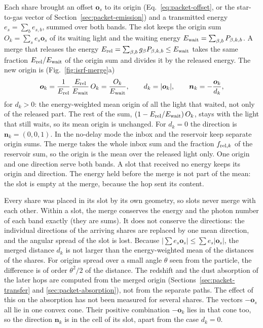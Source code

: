 Each share brought an offset $\boldsymbol{o}_s$ to its origin
(Eq.~\eqref{eq:packet-offset}, or the star-to-gas vector of
Section~\ref{sec:packet-emission}) and a transmitted energy
$e_s=\sum_b e_{s,b}$, summed over both bands. The slot keeps the origin sum
$O_k=\sum_s e_s\boldsymbol{o}_s$ of its waiting light and the waiting energy
$E_{\rm wait}=\sum_{\beta,b}P_{\beta,k,b}$. A merge that releases the energy
$E_{\rm rel}=\sum_{\beta,b}g_\beta P_{\beta,k,b}\le E_{\rm wait}$ takes the
same fraction $E_{\rm rel}/E_{\rm wait}$ of the origin sum and divides it by
the released energy. The new origin is (Fig.~\ref{fig:isrf-merge}a)
\begin{equation}
  \boldsymbol{o}_k = \frac{1}{E_{\rm rel}}\,
  \frac{E_{\rm rel}}{E_{\rm wait}}\,O_k = \frac{O_k}{E_{\rm wait}},
  \qquad d_k=|\boldsymbol{o}_k|, \qquad
  \boldsymbol{n}_k = -\frac{\boldsymbol{o}_k}{d_k},
  \label{eq:packet-merge-origin}
\end{equation}
for $d_k>0$: the energy-weighted mean origin of all the light that waited, not
only of the released part. The rest of the sum,
$(1-E_{\rm rel}/E_{\rm wait})\,O_k$, stays with the light that still waits, so
its mean origin is unchanged. For $d_k=0$ the direction is
$\boldsymbol{n}_k=(0,0,1)$. In the no-delay mode the inbox and the reservoir
keep separate origin sums. The merge takes the whole inbox sum and the
fraction $f_{{\rm rel},k}$ of the reservoir sum, so the origin is the mean
over the released light only. One
origin and one direction serve both bands. A slot that received no energy
keeps its origin and direction. The energy held before the merge is not part
of the mean: the slot is empty at the merge, because the hop sent its content.

Every share was placed in its slot by its own geometry, so slots never merge
with each other. Within a slot, the merge conserves the energy and the photon
number of each band exactly (they are sums). It does not conserve the
directions: the individual directions of the arriving shares are replaced by
one mean direction, and the angular spread of the slot is lost. Because
$|\sum e_s\boldsymbol{o}_s|\le\sum e_s|\boldsymbol{o}_s|$, the merged distance
$d_k$ is not larger than the energy-weighted mean of the distances of the
shares. For origins spread over a small angle $\theta$ seen from the
particle, the difference is of order $\theta^2/2$ of the distance. The
redshift and the dust absorption of the later hops are computed from the
merged origin (Sections~\ref{sec:packet-transfer} and
\ref{sec:packet-absorption}), not from the separate paths. The effect of this
on the absorption has not been measured for several shares. The
vectors $-\boldsymbol{o}_s$ all lie in one convex cone. Their positive
combination $-\boldsymbol{o}_k$ lies in that cone too, so the direction
$\boldsymbol{n}_k$ is in the cell of its slot, apart from the case $d_k=0$.

